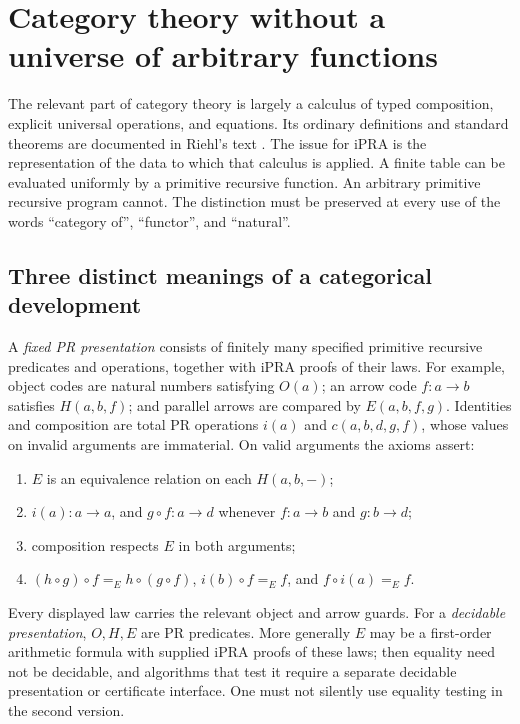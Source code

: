 \section{Category theory without a universe of arbitrary functions}
\label{sec:category-framework}

The relevant part of category theory is largely a calculus of typed composition,
explicit universal operations, and equations.  Its ordinary definitions and
standard theorems are documented in Riehl's text \cite{riehl2016}.  The issue for
iPRA is the representation of the data to which that calculus is applied.  A
finite table can be evaluated uniformly by a primitive recursive function.  An
arbitrary primitive recursive program cannot.  The distinction must be preserved
at every use of the words ``category of'', ``functor'', and ``natural''.

\subsection{Three distinct meanings of a categorical development}

A \emph{fixed PR presentation} consists of finitely many specified primitive
recursive predicates and operations, together with iPRA proofs of their laws.
For example, object codes are natural numbers satisfying $O(a)$; an arrow code
$f:a\to b$ satisfies $H(a,b,f)$; and parallel arrows are compared by
$E(a,b,f,g)$.  Identities and composition are total PR operations $i(a)$ and
$c(a,b,d,g,f)$, whose values on invalid arguments are immaterial.  On valid
arguments the axioms assert:
\begin{enumerate}
\item $E$ is an equivalence relation on each $H(a,b,-)$;
\item $i(a):a\to a$, and $g\circ f:a\to d$ whenever $f:a\to b$ and $g:b\to d$;
\item composition respects $E$ in both arguments;
\item $(h\circ g)\circ f=_{E}h\circ(g\circ f)$,
      $i(b)\circ f=_{E}f$, and $f\circ i(a)=_{E}f$.
\end{enumerate}
Every displayed law carries the relevant object and arrow guards.  For a
\emph{decidable presentation}, $O,H,E$ are PR predicates.  More generally $E$ may
be a first-order arithmetic formula with supplied iPRA proofs of these laws;
then equality need not be decidable, and algorithms that test it require a
separate decidable presentation or certificate interface.  One must not silently
use equality testing in the second version.

